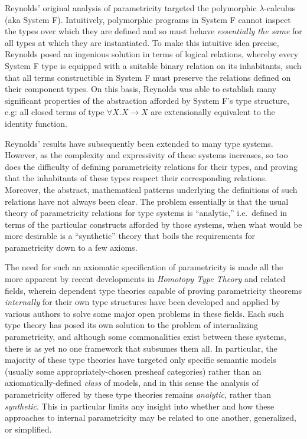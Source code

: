 \documentclass[
  12pt]{article}
\begin{document}
Reynolds' original analysis of parametricity targeted the polymorphic
\(\lambda\)-calculus (aka System F). Intuitively, polymorphic programs
in System F cannot inspect the types over which they are defined and so
must behave \emph{essentially the same} for all types at which they are
instantiated. To make this intuitive idea precise, Reynolds posed an
ingenious solution in terms of logical relations, whereby every System F
type is equipped with a suitable binary relation on its inhabitants,
such that all terms constructible in System F must preserve the
relations defined on their component types. On this basis, Reynolds was
able to establish many significant properties of the abstraction
afforded by System F's type structure, e.g: all closed terms of type
\(\forall X . X \to X\) are extensionally equivalent to the identity
function.

Reynolds' results have subsequently been extended to many type systems.
However, as the complexity and expressivity of these systems increases,
so too does the difficulty of defining parametricity relations for their
types, and proving that the inhabitants of these types respect their
corresponding relations. Moreover, the abstract, mathematical patterns
underlying the definitions of such relations have not always been clear.
The problem essentially is that the usual theory of parametricity
relations for type systems is ``analytic,'' i.e.~defined in terms of the
particular constructs afforded by those systems, when what would be more
desirable is a ``synthetic'' theory that boils the requirements for
parametricity down to a few axioms.

The need for such an axiomatic specification of parametricity is made
all the more apparent by recent developments in \emph{Homotopy Type
Theory} and related fields, wherein dependent type theories capable of
proving parametricity theorems \emph{internally} for their own type
structures have been developed and applied by various authors to solve
some major open problems in these fields. Each such type theory has
posed its own solution to the problem of internalizing parametricity,
and although some commonalities exist between these systems, there is as
yet no one framework that subsumes them all. In particular, the majority
of these type theories have targeted only specific semantic models
(usually some appropriately-chosen presheaf categories) rather than an
axiomatically-defined \emph{class} of models, and in this sense the
analysis of parametricity offered by these type theories remains
\emph{analytic,} rather than \emph{synthetic}. This in particular limits
any insight into whether and how these approaches to internal
parametricity may be related to one another, generalized, or simplified.
\end{document}
